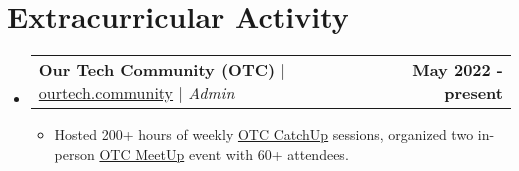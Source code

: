 \documentclass[letterpaper,11pt]{article}
\makeatletter
\newcommand{\resumeItem}[1]{
  \item\small{
    {#1 \vspace{-2pt}}
  }
}
\newcommand{\resumeProjectHeading}[2]{
    \item
    \begin{tabular*}{1.001\textwidth}{l@{\extracolsep{\fill}}r}
      \small#1 & \textbf{\small #2}\\
    \end{tabular*}\vspace{-7pt}
}
\newcommand{\resumeSubHeadingListStart}{\begin{itemize}[leftmargin=0.0in, label={}]}
\newcommand{\resumeSubHeadingListEnd}{\end{itemize}}
\newcommand{\resumeItemListStart}{\begin{itemize}}
\newcommand{\resumeItemListEnd}{\end{itemize}\vspace{-5pt}}
\makeatother
\begin{document}



\section{Extracurricular Activity}
    \vspace{-7pt}
    \resumeSubHeadingListStart
        \resumeProjectHeading
            {\textbf{\normalsize{Our Tech Community (OTC)}} $|$ \normalfont\href{https://ourtech.community}{ourtech.community} $|$ \emph{Admin}}{May 2022 - present}
            \resumeItemListStart
                \resumeItem{Hosted 200+ hours of weekly \href{https://catchup.ourtech.community}{OTC CatchUp} sessions, organized two in-person \href{https://meetup.ourtech.community}{OTC MeetUp} event with 60+ attendees.}
            \resumeItemListEnd
        \vspace{-18pt}



    \resumeSubHeadingListEnd
\vspace{-8pt}
\end{document}
